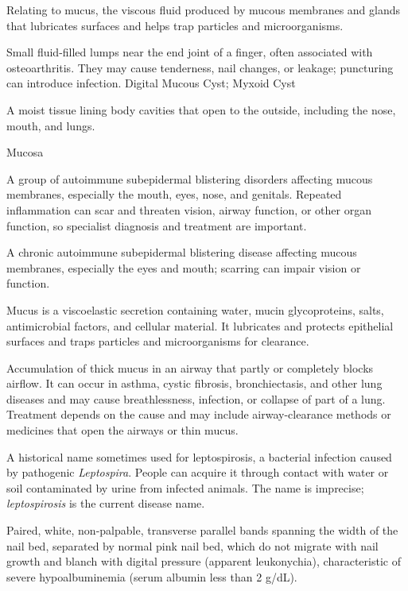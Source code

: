  Relating to mucus, the viscous fluid produced by mucous membranes and glands that lubricates surfaces and helps trap particles and microorganisms.

 Small fluid-filled lumps near the end joint of a finger, often associated with osteoarthritis. They may cause tenderness, nail changes, or leakage; puncturing can introduce infection.
\synonyms
Digital Mucous Cyst; Myxoid Cyst

 A moist tissue lining body cavities that open to the outside, including the nose, mouth, and lungs.

\synonyms
Mucosa

 A group of autoimmune subepidermal blistering disorders affecting mucous membranes, especially the mouth, eyes, nose, and genitals. Repeated inflammation can scar and threaten vision, airway function, or other organ function, so specialist diagnosis and treatment are important.

 A chronic autoimmune subepidermal blistering disease affecting mucous membranes, especially the eyes and mouth; scarring can impair vision or function.

 Mucus is a viscoelastic secretion containing water, mucin glycoproteins, salts, antimicrobial factors, and cellular material. It lubricates and protects epithelial surfaces and traps particles and microorganisms for clearance.

 Accumulation of thick mucus in an airway that partly or completely blocks airflow. It can occur in asthma, cystic fibrosis, bronchiectasis, and other lung diseases and may cause breathlessness, infection, or collapse of part of a lung. Treatment depends on the cause and may include airway-clearance methods or medicines that open the airways or thin mucus.

 A historical name sometimes used for leptospirosis, a bacterial infection caused by pathogenic \textit{Leptospira}. People can acquire it through contact with water or soil contaminated by urine from infected animals. The name is imprecise; \textit{leptospirosis} is the current disease name.

 Paired, white, non-palpable, transverse parallel bands spanning the width of the nail bed, separated by normal pink nail bed, which do not migrate with nail growth and blanch with digital pressure (apparent leukonychia), characteristic of severe hypoalbuminemia (serum albumin less than 2 g/dL).

